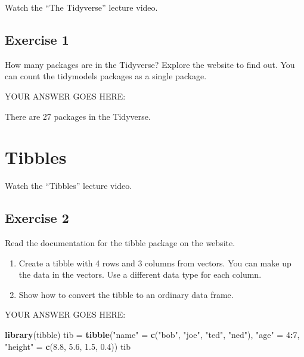 \documentclass[
]{article}
\newenvironment{Shaded}{\begin{snugshade}}{\end{snugshade}}
\newcommand{\DecValTok}[1]{\textcolor[rgb]{0.00,0.00,0.81}{#1}}
\newcommand{\FloatTok}[1]{\textcolor[rgb]{0.00,0.00,0.81}{#1}}
\newcommand{\KeywordTok}[1]{\textcolor[rgb]{0.13,0.29,0.53}{\textbf{#1}}}
\newcommand{\NormalTok}[1]{#1}
\newcommand{\OperatorTok}[1]{\textcolor[rgb]{0.81,0.36,0.00}{\textbf{#1}}}
\newcommand{\StringTok}[1]{\textcolor[rgb]{0.31,0.60,0.02}{#1}}
\begin{document}
Watch the ``The Tidyverse'' lecture video.

\hypertarget{exercise-1}{%
\subsection{Exercise 1}\label{exercise-1}}

How many packages are in the Tidyverse? Explore the website to find out.
You can count the tidymodels packages as a single package.

YOUR ANSWER GOES HERE:

There are 27 packages in the Tidyverse.

\hypertarget{tibbles}{%
\section{Tibbles}\label{tibbles}}

Watch the ``Tibbles'' lecture video.

\hypertarget{exercise-2}{%
\subsection{Exercise 2}\label{exercise-2}}

Read the documentation for the tibble package on the website.

\begin{enumerate}
\def\labelenumi{\arabic{enumi}.}
\item
  Create a tibble with 4 rows and 3 columns from vectors. You can make
  up the data in the vectors. Use a different data type for each column.
\item
  Show how to convert the tibble to an ordinary data frame.
\end{enumerate}

YOUR ANSWER GOES HERE:

\begin{Shaded}
\begin{Highlighting}[]
\KeywordTok{library}\NormalTok{(tibble)}
\NormalTok{tib =}\StringTok{ }\KeywordTok{tibble}\NormalTok{(}\StringTok{"name"}\NormalTok{ =}\StringTok{ }\KeywordTok{c}\NormalTok{(}\StringTok{"bob"}\NormalTok{, }\StringTok{"joe"}\NormalTok{, }\StringTok{"ted"}\NormalTok{, }\StringTok{"ned"}\NormalTok{),}
   \StringTok{"age"}\NormalTok{ =}\StringTok{ }\DecValTok{4}\OperatorTok{:}\DecValTok{7}\NormalTok{, }\StringTok{"height"}\NormalTok{ =}\StringTok{ }\KeywordTok{c}\NormalTok{(}\FloatTok{8.8}\NormalTok{, }\FloatTok{5.6}\NormalTok{, }\FloatTok{1.5}\NormalTok{, }\FloatTok{0.4}\NormalTok{))}
\NormalTok{tib}
\end{Highlighting}
\end{Shaded}
\end{document}
